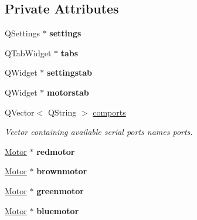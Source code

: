 \subsection*{Private Attributes}
\begin{DoxyCompactItemize}
\item 
\mbox{\label{classcagecontrol_aaa56b3d1bbf35785c21c5465eef48185}} 
Q\+Settings $\ast$ {\bfseries settings}
\item 
\mbox{\label{classcagecontrol_abc80d835c69ca52a62f18c341c2bd009}} 
Q\+Tab\+Widget $\ast$ {\bfseries tabs}
\item 
\mbox{\label{classcagecontrol_a5350ebcf40a0c709af82276e6ce2284d}} 
Q\+Widget $\ast$ {\bfseries settingstab}
\item 
\mbox{\label{classcagecontrol_a9c0bb2384100cced3b96363cca8e5428}} 
Q\+Widget $\ast$ {\bfseries motorstab}
\item 
\mbox{\label{classcagecontrol_a1fa2f1480f616b4f7142f9e7a471cef3}} 
Q\+Vector$<$ Q\+String $>$ \hyperlink{classcagecontrol_a1fa2f1480f616b4f7142f9e7a471cef3}{comports}
\begin{DoxyCompactList}\small\item\em Vector containing available serial ports names ports. \end{DoxyCompactList}\item 
\mbox{\label{classcagecontrol_aba1bc33f1f9a17cfa548f1390d4a9358}} 
\hyperlink{classMotor}{Motor} $\ast$ {\bfseries redmotor}
\item 
\mbox{\label{classcagecontrol_a5a58ab2407ea37d47b00dfa31fbd837e}} 
\hyperlink{classMotor}{Motor} $\ast$ {\bfseries brownmotor}
\item 
\mbox{\label{classcagecontrol_a15f7d52bdae84ce7d23274254bed283a}} 
\hyperlink{classMotor}{Motor} $\ast$ {\bfseries greenmotor}
\item 
\mbox{\label{classcagecontrol_a0b188226c1976ff8b89f4a043320c0d7}} 
\hyperlink{classMotor}{Motor} $\ast$ {\bfseries bluemotor}
\item 

\end{DoxyCompactItemize}
